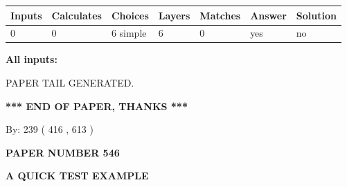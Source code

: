 \documentclass[12pt]{article}
\begin{document}
 
\noindent{}
 
 
   
   
   
   
\noindent\begin{tabular}{|l|l|l|l|l|l|l|}
 \hline
Inputs & Calculates & Choices & Layers & Matches & Answer & Solution \\ \hline
 0  & 
 0  & 
 6
  simple  
  & 
 6  & 
 0  & 
  yes & 
  no 
  \\ \hline
 \end{tabular}
   
   
   
   
\noindent{}
   
   
   
   
\noindent\vspace{0.1in}\hspace{-0.08in} {\textbf{\Large{All inputs: }}}
   
   
   
   
   
   
 \vspace{0.2in}
 
   
   
\vspace{2.0in} PAPER TAIL GENERATED.
   
   
   
   
\vspace{1.0in} 
{\textbf{\large{ *** END OF PAPER, THANKS *** }}} 
   
   
\hspace{1.0in} By: 
 239 ( 416 ,  613 )
   
   
   
   
\newpage 
\setcounter{page}{ 
   546001 } 
   
   
   
   
 {\textbf{ \Large{ PAPER NUMBER  546  }}}
   
   
\vspace{0.2in}
   
   
   
   
   
   
   
   
 \vspace{0.2in}
{\LARGE {\textbf{ A QUICK TEST EXAMPLE}}}
   
\end{document}
